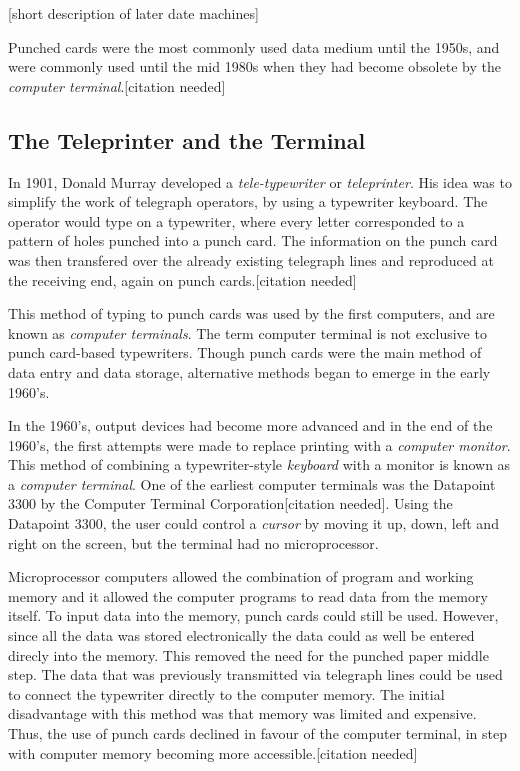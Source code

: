 [short description of later date machines]

Punched cards were the most commonly used data medium until the 1950s, and were commonly used until the mid 1980s when they had become obsolete by the \emph{computer terminal}.[citation needed]

\subsection{The Teleprinter and the Terminal}
In 1901, Donald Murray developed a \emph{tele-typewriter} or \emph{teleprinter}. His idea was to simplify the work of telegraph operators, by using a typewriter keyboard. The operator would type on a typewriter, where every letter corresponded to a pattern of holes punched into a punch card. The information on the punch card was then transfered over the already existing telegraph lines and reproduced at the receiving end, again on punch cards.[citation needed]

This method of typing to punch cards was used by the first computers, and are known as \emph{computer terminals}. The term computer terminal is not exclusive to punch card-based typewriters. Though punch cards were the main method of data entry and data storage, alternative methods began to emerge in the early 1960's. 

In the 1960's, output devices had become more advanced and in the end of the 1960's, the first attempts were made to replace printing with a \emph{computer monitor}. This method of combining a typewriter-style \emph{keyboard} with a monitor is known as a \emph{computer terminal}. One of the earliest computer terminals was the Datapoint 3300 by the Computer Terminal Corporation[citation needed]. Using the Datapoint 3300, the user could control a \emph{cursor} by moving it up, down, left and right on the screen, but the terminal had no microprocessor.

Microprocessor computers allowed the combination of program and working memory and it allowed the computer programs to read data from the memory itself. To input data into the memory, punch cards could still be used. However, since all the data was stored electronically the data could as well be entered direcly into the memory. This removed the need for the punched paper middle step. The data that was previously transmitted via telegraph lines could be used to connect the typewriter directly to the computer memory. The initial disadvantage with this method was that memory was limited and expensive. Thus, the use of punch cards declined in favour of the computer terminal, in step with computer memory becoming more accessible.[citation needed]

